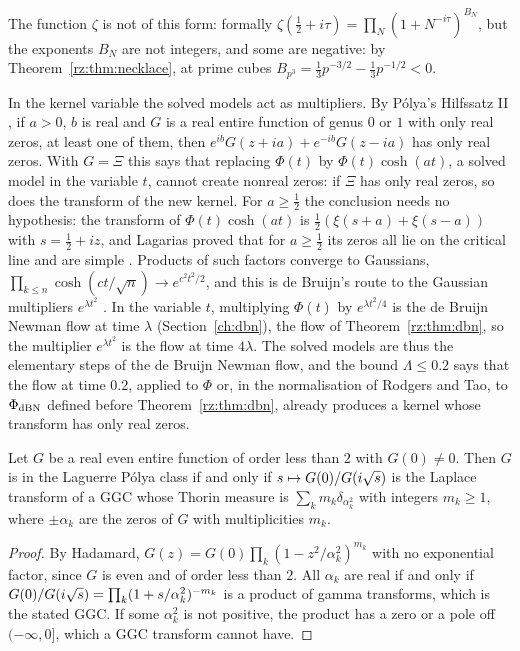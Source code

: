The function $\zeta$ is not of this form: formally $\zeta(\frac12+i\tau)=\prod_N(1+N^{-i\tau})^{B_N}$, but the exponents $B_N$ are not integers, and some are negative: by Theorem~\ref{rz:thm:necklace}, at prime cubes $B_{p^3}=\frac13p^{-3/2}-\frac13p^{-1/2}<0$.

In the kernel variable the solved models act as multipliers. By P\'olya's Hilfssatz II \cite[Hilfssatz~II]{Polya}, if $a>0$, $b$ is real and $G$ is a real entire function of genus $0$ or $1$ with only real zeros, at least one of them, then $e^{ib}G(z+ia)+e^{-ib}G(z-ia)$ has only real zeros. With $G=\Xi$ this says that replacing $\Phi(t)$ by $\Phi(t)\cosh(at)$, a solved model in the variable $t$, cannot create nonreal zeros: if $\Xi$ has only real zeros, so does the transform of the new kernel. For $a\ge\frac12$ the conclusion needs no hypothesis: the transform of $\Phi(t)\cosh(at)$ is $\frac12(\xi(s+a)+\xi(s-a))$ with $s=\frac12+iz$, and Lagarias proved that for $a\ge\frac12$ its zeros all lie on the critical line and are simple \cite{Lagarias05}. Products of such factors converge to Gaussians, $\prod_{k\le n}\cosh(ct/\sqrt n)\to e^{c^2t^2/2}$, and this is de Bruijn's route to the Gaussian multipliers $e^{\lambda t^2}$ \cite{deBruijn}. In the variable $t$, multiplying $\Phi(t)$ by $e^{\lambda t^2/4}$ is the de Bruijn Newman flow at time $\lambda$ (Section~\ref{ch:dbn}), the flow of Theorem~\ref{rz:thm:dbn}, so the multiplier $e^{\lambda t^2}$ is the flow at time $4\lambda$. The solved models are thus the elementary steps of the de Bruijn Newman flow, and the bound $\Lambda\le0.2$ \cite{PT21} says that the flow at time $0.2$, applied to $\Phi$ or, in the normalisation of Rodgers and Tao, to $\Phi_{\rm dBN}$ defined before Theorem~\ref{rz:thm:dbn}, already produces a kernel whose transform has only real zeros.

\begin{proposition}\label{rz:prop:lpthorin}
Let $G$ be a real even entire function of order less than $2$ with $G(0)\ne0$. Then $G$ is in the Laguerre P\'olya class if and only if $s\mapsto G(0)/G(i\sqrt{s})$ is the Laplace transform of a GGC whose Thorin measure is $\sum_km_k\delta_{\alpha_k^2}$ with integers $m_k\ge1$, where $\pm\alpha_k$ are the zeros of $G$ with multiplicities $m_k$.
\end{proposition}

\begin{proof}
By Hadamard, $G(z)=G(0)\prod_k(1-z^2/\alpha_k^2)^{m_k}$ with no exponential factor, since $G$ is even and of order less than $2$. All $\alpha_k$ are real if and only if $G(0)/G(i\sqrt{s})=\prod_k(1+s/\alpha_k^2)^{-m_k}$ is a product of gamma transforms, which is the stated GGC. If some $\alpha_k^2$ is not positive, the product has a zero or a pole off $(-\infty,0]$, which a GGC transform cannot have.
\end{proof}

